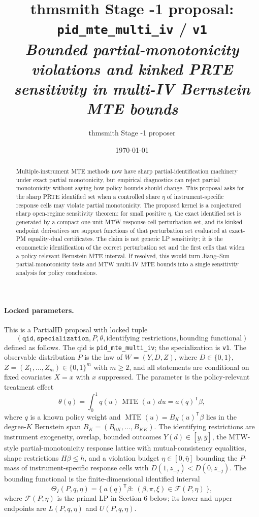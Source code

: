 \documentclass[11pt]{article}
\title{thmsmith Stage -1 proposal: \texttt{pid\_mte\_multi\_iv} / \texttt{v1}%
  \\ \large\textit{Bounded partial-monotonicity violations and kinked PRTE sensitivity in multi-IV Bernstein MTE bounds}}
\author{thmsmith Stage -1 proposer}
\date{\today}
\newcommand{\transpose}{\mathsf{T}}
\theoremstyle{definition}
\theoremstyle{plain}
\theoremstyle{remark}
\begin{document}
\maketitle


\paragraph{Locked parameters.}
This is a PartialID proposal with locked tuple
\[
(\texttt{qid},\texttt{specialization},P,\theta,\text{identifying restrictions},\text{bounding functional})
\]
defined as follows.  The qid is \texttt{pid\_mte\_multi\_iv}; the specialization is \texttt{v1}.  The observable distribution \(P\) is the law of \(W=(Y,D,Z)\), where \(D\in\{0,1\}\), \(Z=(Z_1,\ldots,Z_m)\in\{0,1\}^m\) with \(m\ge2\), and all statements are conditional on fixed covariates \(X=x\) with \(x\) suppressed.  The parameter is the policy-relevant treatment effect
\[
\theta(q)=\int_0^1 q(u)\,\operatorname{MTE}(u)\,du=a(q)^\transpose\beta,
\]
where \(q\) is a known policy weight and \(\operatorname{MTE}(u)=B_K(u)^\transpose\beta\) lies in the degree-\(K\) Bernstein span \(B_K=(B_{0K},\ldots,B_{KK})\).  The identifying restrictions are instrument exogeneity, overlap, bounded outcomes \(Y(d)\in[\underline y,\bar y]\), the MTW-style partial-monotonicity response lattice with mutual-consistency equalities, shape restrictions \(H\beta\le h\), and a violation budget \(\eta\in[0,\bar\eta]\) bounding the \(P\)-mass of instrument-specific response cells with \(D(1,z_{-j})<D(0,z_{-j})\).  The bounding functional is the finite-dimensional identified interval
\[
\Theta_I(P,q,\eta)=\{\ a(q)^\transpose\beta:\ (\beta,\pi,\xi)\in\mathcal F(P,\eta)\ \},
\]
where \(\mathcal F(P,\eta)\) is the primal LP in Section 6 below; its lower and upper endpoints are \(L(P,q,\eta)\) and \(U(P,q,\eta)\).

\begin{abstract}
Multiple-instrument MTE methods now have sharp partial-identification machinery under exact partial monotonicity, but empirical diagnostics can reject partial monotonicity without saying how policy bounds should change.  This proposal asks for the sharp PRTE identified set when a controlled share \(\eta\) of instrument-specific response cells may violate partial monotonicity.  The proposed kernel is a conjectured sharp open-regime sensitivity theorem: for small positive \(\eta\), the exact identified set is generated by a compact one-unit MTW response-cell perturbation set, and its kinked endpoint derivatives are support functions of that perturbation set evaluated at exact-PM equality-dual certificates.  The claim is not generic LP sensitivity; it is the econometric identification of the correct perturbation set and the first cells that widen a policy-relevant Bernstein MTE interval.  If resolved, this would turn Jiang--Sun partial-monotonicity tests and MTW multi-IV MTE bounds into a single sensitivity analysis for policy conclusions.
\end{abstract}
\end{document}
